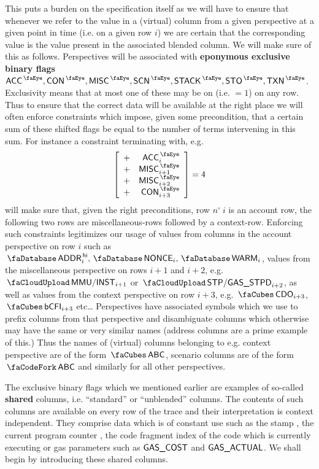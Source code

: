 This puts a burden on the specification itself as we will have to ensure that whenever we refer to the value in a (virtual) column from a given perspective at a given point in time (i.e. on a given row $i$) we are certain that the corresponding value is the value present in the associated blended column.
We will make sure of this as follows.
Perspectives will be associated with \textbf{eponymous exclusive binary flags} $\peekAccount, \peekContext, \peekMisc, \peekScenario, \peekStack, \peekStorage, \peekTransaction$.
Exclusivity means that at most one of these may be on (i.e. $=1$) on any row.
Thus to ensure that the correct data will be available at the right place we will often enforce constraints which impose, given some precondition, that a certain sum of these shifted flags be equal to the number of terms intervening in this sum. For instance a constraint terminating with, e.g.
\[
	\left[ \begin{array}{cr}
		+ & \peekAccount_{i} \\
		+ & \peekMisc   _{i + 1} \\
		+ & \peekMisc   _{i + 2} \\
		+ & \peekContext_{i + 3} \\
	\end{array} \right]
	=
	4
\]
will make sure that, given the right preconditions, row $n^\circ~i$ is an account row, the following two rows are miscellaneous-rows followed by a context-row.
Enforcing such constraints legitimizes our usage of values from columns in the account perspective on row $i$ such as $\accAddressHi_{i}, \accNonce_{i}, \accWarmth_{i}$,
values from the miscellaneous perspective on rows $i + 1$ and $i + 2$, e.g. $\miscMmuInst_{i + 1}$ or $\miscStpGasStipend_{i + 2}$,
as well as values from the context perspective on row $i + 3$, e.g. $\cnCdo_{i + 3}$, $\cnCodeCfi_{i + 3}$ etc\dots{}
\saNote{} Perspectives have associated symbols which we use to prefix columns from that perspective and disambiguate columns which otherwise may have the same or very similar names (address columns are a prime example of this.)
Thus the names of (virtual) columns belonging to e.g.
context perspective are of the form $\contextSignifier\col{ABC}$,
scenario columns are of the form $\scenarioSignifier\col{ABC}$ and similarly for all other perspectives.

The exclusive binary flags which we mentioned earlier are examples of so-called \textbf{shared} columns, i.e. ``standard'' or ``unblended'' columns.
The contents of such columns are available on every row of the trace and their interpretation is context independent.
They comprise data which is of constant use such as the \hubMod{} stamp \hubStamp{}, the current program counter \pc{}, the code fragment index \cfi{} of the code which is currently executing or gas parameters such as $\textsf{GAS}\textsf{\_COST}$ and $\textsf{GAS}\textsf{\_ACTUAL}$.
We shall begin by introducing these shared columns.

